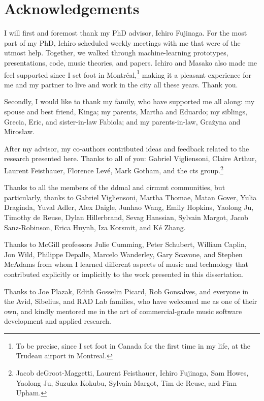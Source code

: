 \chapter*{Acknowledgements}
\label{chap:acknowledgements}

I will first and foremost thank my PhD advisor, Ichiro
Fujinaga. For the most part of my PhD, Ichiro scheduled
weekly meetings with me that were of the utmost help.
Together, we walked through machine-learning prototypes,
presentations, code, music theories, and papers. Ichiro and
Masako also made me feel supported since I set foot in
Montr\'eal,\footnote{To be precise, since I set foot in
Canada for the first time in my life, at the Trudeau airport
in Montreal.} making it a pleasant experience for me and my
partner to live and work in the city all these years. Thank
you.

Secondly, I would like to thank my family, who have
supported me all along: my spouse and best friend, Kinga; my
parents, Martha and Eduardo; my siblings, Grecia, Eric, and
sister-in-law Fabiola; and my parents-in-law, Gra\.zyna and
Miros\l{}aw.

After my advisor, my co-authors contributed ideas and
feedback related to the research presented here. Thanks to
all of you: Gabriel Vigliensoni, Claire Arthur, Laurent
Feisthauer, Florence Lev\'e, Mark Gotham, and the \gls{cts}
group.\footnote{Jacob deGroot-Maggetti, Laurent Feisthauer,
Ichiro Fujinaga, Sam Howes, Yaolong Ju, Suzuka Kokubu,
Sylvain Margot, Tim de Reuse, and Finn Upham.}

Thanks to all the members of the \gls{ddmal} and
\gls{cirmmt} communities, but particularly, thanks to
Gabriel Vigliensoni, Martha Thomae, Matan Gover, Yulia
Draginda, Yuval Adler, Alex Daigle, Junhao Wang, Emily
Hopkins, Yaolong Ju, Timothy de Reuse, Dylan Hillerbrand,
Sevag Hanssian, Sylvain Margot, Jacob Sanz-Robinson, Erica
Huynh, Iza Korsmit, and K\'e Zhang.

Thanks to McGill professors Julie Cumming, Peter Schubert,
William Caplin, Jon Wild, Philippe Depalle, Marcelo
Wanderley, Gary Scavone, and Stephen McAdams from whom I
learned different aspects of music and technology that
contributed explicitly or implicitly to the work presented
in this dissertation.

Thanks to Joe Plazak, Edith Gosselin Picard, Rob Gonsalves,
and everyone in the Avid, Sibelius, and RAD Lab families,
who have welcomed me as one of their own, and kindly
mentored me in the art of commercial-grade music software
development and applied research.

